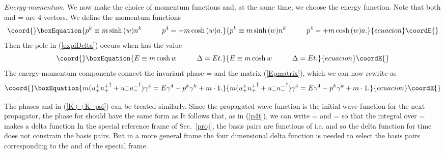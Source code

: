 \documentclass[a4paper,12pt]{article}
\begin{document}
	{\textit{Energy-momentum}}. We now make the choice of momentum functions and, at the same time, we choose the energy function. Note that both \coordHE{} and \coordHE{} = \coordHE{} are 4-vectors. We define the momentum functions
\begin{equation}\coord{}\boxEquation{ \label{pk}
p^{k} \equiv m \sinh{(w)} n^{k} \hspace{1cm} p^{4} = +m \cosh{(w)} a.
}{ p^{k} \equiv m \sinh{(w)} n^{k} \hspace{1cm} p^{4} = +m \cosh{(w)} a.
}{ecuacion}\coordE{}\end{equation}
Then the pole in (\ref{expiDelta}) occurs when \coordHE{} has the value \coordHE{}
\begin{equation}\coord{}\boxEquation{	\label{E}
E \equiv m \cosh{w} \hspace{1cm} \Delta = Et.
}{	E \equiv m \cosh{w} \hspace{1cm} \Delta = Et.
}{ecuacion}\coordE{}\end{equation} 
The energy-momentum components connect the invariant phase \coordHE{} = \coordHE{}  \coordHE{} and the matrix (\ref{Epmatrix}), which we can now rewrite as
\begin{equation}\coord{}\boxEquation{	\label{Epmatrix1}
m ( u_{+}^{+ } {u_{+}^{+  }}^{\dagger} + u_{-}^{- } {u_{-}^{- }}^{\dagger} ) \gamma^{4} = E \gamma^{4} - p^{k} \gamma^{k} + m \cdot 1  .
}{	m ( u_{+}^{+ } {u_{+}^{+  }}^{\dagger} + u_{-}^{- } {u_{-}^{- }}^{\dagger} ) \gamma^{4} = E \gamma^{4} - p^{k} \gamma^{k} + m \cdot 1  .
}{ecuacion}\coordE{}\end{equation}

	The phases \coordHE{} and \coordHE{} in (\ref{K++K--psi}) can be treated similarly. Since the propagated wave function \coordHE{} is the initial wave function for the next propagator, the phase for \coordHE{} should have the same form as \coordHE{} It follows that, as in (\ref{p4t}), we can write \coordHE{} = \coordHE{} and \coordHE{} = \coordHE{} so that the integral over \coordHE{} = \coordHE{} makes a delta function \coordHE{} In the special reference frame of Sec.~\ref{proj}, the basis pairs are functions of \coordHE{} i.e. \coordHE{} and \coordHE{} so the delta function for time does not constrain the basis pairs. But in a more general frame the four dimensional delta function is needed to select the basis pairs corresponding to the \coordHE{} and \coordHE{} of the special frame.
\end{document}
